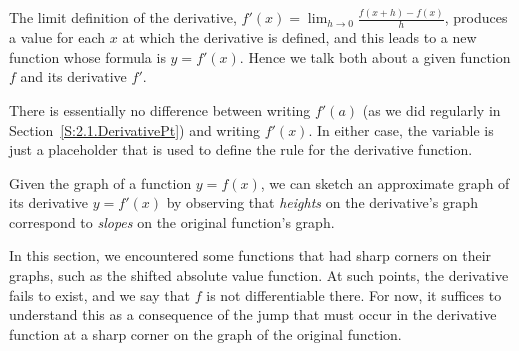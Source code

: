 \begin{summary}
\item The limit definition of the derivative, $f'(x) = \lim_{h \to 0} \frac{f(x+h)-f(x)}{h}$, produces a value for each $x$ at which the derivative is defined, and this leads to a new function whose formula is $y = f'(x)$.  Hence we talk both about a given function $f$ and its derivative $f'$.  

\item There is essentially no difference between writing $f'(a)$ (as we did regularly in Section~\ref{S:2.1.DerivativePt}) and writing $f'(x)$.  In either case, the variable is just a placeholder that is used to define the rule for the derivative function.

\item Given the graph of a function $y = f(x)$, we can sketch an approximate graph of its derivative $y = f'(x)$ by observing that \emph{heights} on the derivative's graph correspond to \emph{slopes} on the original function's graph.

\item In this section, we encountered some functions that had sharp corners on their graphs, such as the shifted absolute value function.  At such points, the derivative fails to exist, and we say that $f$ is not differentiable there.  For now, it suffices to understand this as a consequence of the jump that must occur in the derivative function at a sharp corner on the graph of the original function.  
\end{summary}

 

\cleardoublepage